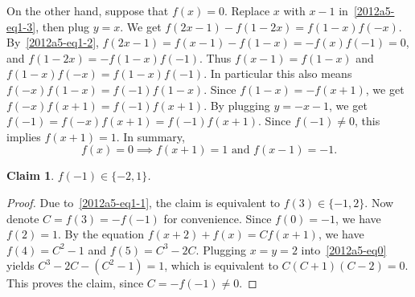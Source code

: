 \documentclass{article}
\newtheorem*{claim}{Claim}
\begin{document}
On the other hand, suppose that $f(x) = 0$.
Replace $x$ with $x - 1$ in~\eqref{2012a5-eq1-3}, then plug $y = x$.
We get $f(2x - 1) - f(1 - 2x) = f(1 - x) f(-x)$.
By~\eqref{2012a5-eq1-2}, $f(2x - 1) = f(x - 1) - f(1 - x) = -f(x) f(-1) = 0$, and $f(1 - 2x) = -f(1 - x) f(-1)$.
Thus $f(x - 1) = f(1 - x)$ and $f(1 - x) f(-x) = f(1 - x) f(-1)$.
In particular this also means $f(-x) f(1 - x) = f(-1) f(1 - x)$.
Since $f(1 - x) = -f(x + 1)$, we get $f(-x) f(x + 1) = f(-1) f(x + 1)$.
By plugging $y = -x - 1$, we get $f(-1) = f(-x) f(x + 1) = f(-1) f(x + 1)$.
Since $f(-1) \neq 0$, this implies $f(x + 1) = 1$.
In summary,
\[ f(x) = 0 \implies f(x + 1) = 1 \text{ and } f(x - 1) = -1. \tag{1.5}\label{2012a5-eq1-5} \]

\begin{claim}
$f(-1) \in \{-2, 1\}$.
\end{claim}
\begin{proof}
Due to~\eqref{2012a5-eq1-1}, the claim is equivalent to $f(3) \in \{-1, 2\}$.
Now denote $C = f(3) = -f(-1)$ for convenience.
Since $f(0) = -1$, we have $f(2) = 1$.
By the equation $f(x + 2) + f(x) = C f(x + 1)$, we have $f(4) = C^2 - 1$ and $f(5) = C^3 - 2C$.
Plugging $x = y = 2$ into~\eqref{2012a5-eq0} yields $C^3 - 2C - (C^2 - 1) = 1$, which is equivalent to $C(C + 1)(C - 2) = 0$.
This proves the claim, since $C = -f(-1) \neq 0$.
\end{proof}
\end{document}
